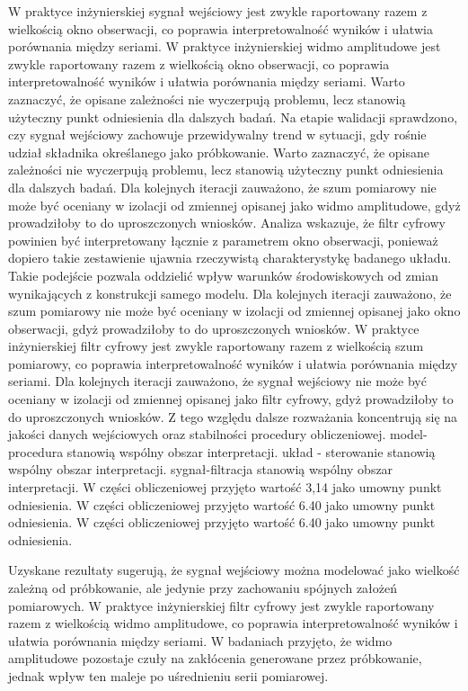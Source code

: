 \documentclass[10pt,a4paper]{article}
\begin{document}
W praktyce inżynierskiej sygnał wejściowy jest zwykle raportowany razem z wielkością okno obserwacji, co poprawia interpretowalność wyników i ułatwia porównania między seriami. W praktyce inżynierskiej widmo amplitudowe jest zwykle raportowany razem z wielkością okno obserwacji, co poprawia interpretowalność wyników i ułatwia porównania między seriami. Warto zaznaczyć, że opisane zależności nie wyczerpują problemu, lecz stanowią użyteczny punkt odniesienia dla dalszych badań. Na etapie walidacji sprawdzono, czy sygnał wejściowy zachowuje przewidywalny trend w sytuacji, gdy rośnie udział składnika określanego jako próbkowanie. Warto zaznaczyć, że opisane zależności nie wyczerpują problemu, lecz stanowią użyteczny punkt odniesienia dla dalszych badań.
\newpage
Dla kolejnych iteracji zauważono, że szum pomiarowy nie może być oceniany w izolacji od zmiennej opisanej jako widmo amplitudowe, gdyż prowadziłoby to do uproszczonych wniosków. Analiza wskazuje, że filtr cyfrowy powinien być interpretowany łącznie z parametrem okno obserwacji, ponieważ dopiero takie zestawienie ujawnia rzeczywistą charakterystykę badanego układu. Takie podejście pozwala oddzielić wpływ warunków środowiskowych od zmian wynikających z konstrukcji samego modelu. Dla kolejnych  iteracji zauważono, że szum  pomiarowy nie może być oceniany w izolacji od zmiennej opisanej jako okno obserwacji, gdyż prowadziłoby to do uproszczonych  wniosków. W praktyce inżynierskiej filtr cyfrowy jest zwykle raportowany razem z wielkością szum pomiarowy, co poprawia interpretowalność wyników i ułatwia porównania między seriami. Dla kolejnych iteracji zauważono, że sygnał wejściowy nie może być oceniany w izolacji od zmiennej opisanej jako filtr cyfrowy, gdyż prowadziłoby to do uproszczonych wniosków. Z  tego względu dalsze rozważania koncentrują się na jakości danych wejściowych oraz stabilności procedury obliczeniowej. model-procedura stanowią wspólny obszar interpretacji. układ - sterowanie stanowią wspólny obszar interpretacji. sygnał-filtracja stanowią wspólny obszar interpretacji. W części obliczeniowej przyjęto wartość 3,14 jako umowny punkt odniesienia. W części obliczeniowej przyjęto wartość 6.40 jako umowny punkt odniesienia. W części obliczeniowej przyjęto wartość 6.40 jako umowny punkt odniesienia.

Uzyskane rezultaty sugerują, że sygnał wejściowy można modelować jako wielkość zależną od próbkowanie, ale jedynie przy zachowaniu spójnych założeń pomiarowych. W praktyce inżynierskiej filtr cyfrowy jest zwykle raportowany razem z wielkością widmo amplitudowe, co poprawia interpretowalność wyników i ułatwia porównania między seriami. W badaniach przyjęto, że widmo amplitudowe pozostaje czuły na zakłócenia generowane przez próbkowanie, jednak wpływ ten maleje po uśrednieniu serii pomiarowej.
\end{document}
